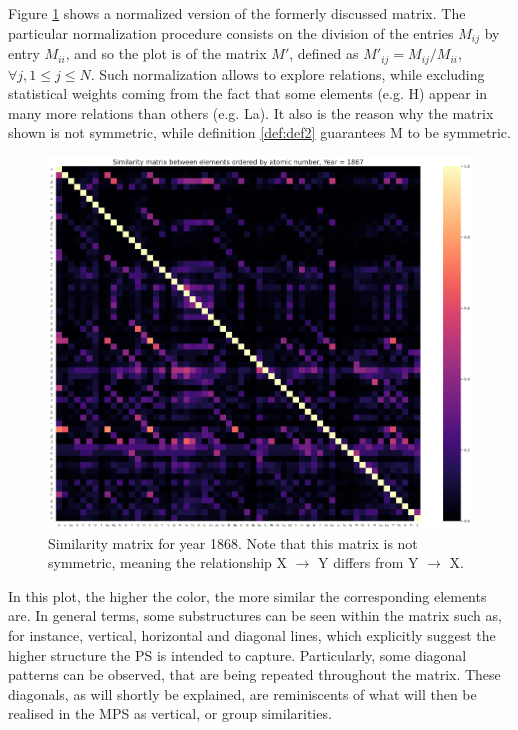 \documentclass[article]{article}
\begin{document}
Figure \ref{fig:fig1} shows a normalized version of the formerly discussed matrix. The particular normalization procedure consists on the division of the entries $M_{ij}$ by entry $M_{ii}$, and so the plot is of the matrix $M'$, defined as $M'_{ij} = M_{ij}/M_{ii}$, $\forall j, 1\leq j \leq N$. Such normalization allows to explore relations, while excluding statistical weights coming from the fact that some elements (e.g. H) appear in many more relations than others (e.g. La). It also is the reason why the matrix shown is not symmetric, while definition \ref{def:def2} guarantees M to be symmetric.\\

\begin{figure}[h!]
  \centering
	\includegraphics[width=14.0cm]{SM_1867.png}
	\caption{Similarity matrix for year 1868. Note that this matrix is not symmetric, meaning the relationship X $\rightarrow$ Y differs from Y $\rightarrow$ X.}
	\label{fig:fig1}
\end{figure}


In this plot, the higher the color, the more similar the corresponding elements are. In general terms, some substructures can be seen within the matrix such as, for instance, vertical, horizontal and diagonal lines, which explicitly suggest the higher structure the PS is intended to capture. Particularly, some diagonal patterns can be observed, that are being repeated throughout the matrix. These diagonals, as will shortly be explained, are reminiscents of what will then be realised in the MPS as vertical, or group similarities. \\
\end{document}
